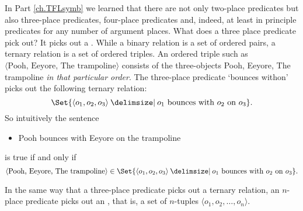 In Part \ref{ch.TFLsymb} we learned that there are not only two-place predicates but also three-place predicates, four-place predicates and, indeed, at least in principle predicates for any number of argument places. What does a three place predicate pick out? It picks out a . While a binary relation is a set of ordered pairs, a ternary relation is a set of ordered triples. An ordered triple such as $\langle\text{Pooh, Eeyore, The trampoline}\rangle$ consists of the three-objects Pooh, Eeyore, The trampoline \emph{in that particular order}. The three-place predicate `bounces withon' picks out the following ternary relation:
$$\Set{\langle o_1,o_2,o_3\rangle \given o_1\text{ bounces with }o_2\text{ on }o_3}.$$
So intuitively the sentence 
\begin{itemize}
\item Pooh bounces with Eeyore on the trampoline
\end{itemize}
is true if and only if
$$\langle\text{Pooh, Eeyore, The trampoline}\rangle\in\Set{\langle o_1,o_2,o_3\rangle \given o_1\text{ bounces with }o_2\text{ on }o_3}.$$

In the same way that a three-place predicate picks out a ternary relation, an $n$-place predicate picks out an , that is, a set of $n$-tuples $\langle o_1,o_2,\ldots,o_n\rangle$.


